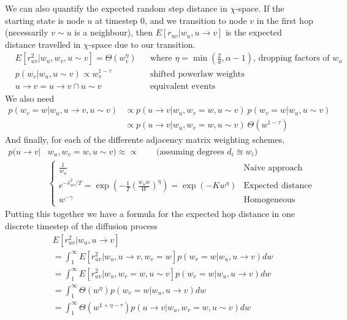 We can also quantify the expected random step distance in $\chi$-space. If the starting state is node $u$ at timestep $0$, and we transition to node $v$ in the first hop (necessarily $v \sim u$ is a neighbour), then $E[r_{uv} | w_u, u \to v]$ is the expected distance travelled in $\chi$-space due to our transition.
\begin{align*}
  &E[r_{uv}^2 | w_u, w_v, u \sim v] = \Theta(w_v^\eta)
  && \text{where $\eta = \min(\frac{2}{d}, \alpha - 1)$, dropping factors of $w_u$}
  \\
  &p(w_v | w_u, u \sim v) \propto w_v^{1 - \tau}
  &&\text{shifted powerlaw weights}
  \\
  & u \to v = u \to v \cap u \sim v && \text{equivalent events}
\end{align*}
We also need
\begin{align*}
  p(w_v = w | w_u, u \to v, u \sim v) 
  &\propto p(u \to v | w_u, w_v=w, u \sim v) \: p(w_v = w | w_u, u \sim v)
  \\
  & \propto p(u \to v | w_u, w_v=w, u \sim v)\: \Theta(w^{1 - \tau})
\end{align*}
And finally, for each of the differente adjacency matrix weighting schemes,
\begin{align*}
  p(u \to v | & w_u, w_v=w, u \sim v) \approx \propto \quad\quad \text{(assuming degrees $d_i \approxeq w_i$)}
  \\ & \begin{cases}
    \frac{1}{w_u} & \text{Naive approach}
    \\
    e^{-\hat{r}_{uv}^2/T} = \exp(-\frac{1}{T} (\frac{w_u w}{W})^{\eta}) = \exp(-K w^{\eta})
    & \text{Expected distance}
    \\
    w^{-\gamma} & \text{Homogeneous}
  \end{cases}
\end{align*}
Putting this together we have a formula for the expected hop distance in one discrete timestep of the diffusion process
\begin{align*}
  &E[r_{uv}^2 | w_u, u \to v]
  \\ 
  &= \int_1^\infty E[r_{uv}^2 | w_u, u \to v, w_v=w] p(w_v = w | w_u, u \to v) dw
  \\
  &= \int_1^\infty E[r_{uv}^2 | w_u, w_v =w, u \sim v] p(w_v = w | w_u, u \to v) dw
  \\
  &= \int_1^\infty \Theta(w^{\eta}) p(w_v = w | w_u, u \to v) dw
  \\
  &= \int_1^\infty \Theta(w^{1 + \eta - \tau}) p(u \to v | w_u, w_v=w, u \sim v) dw
\end{align*}
